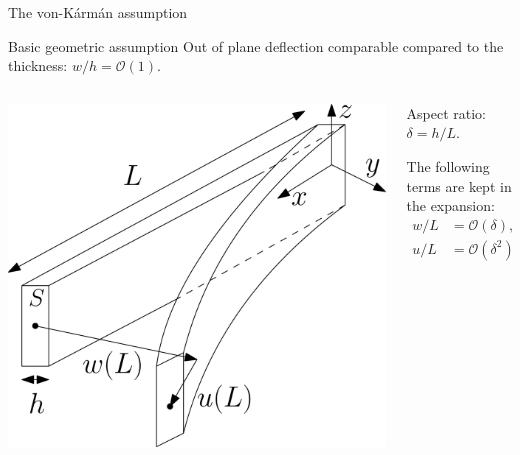 \documentclass[serif]{beamer} %
\begin{document}
\begin{frame}{The von-K\'arm\'an assumption}
		
\begin{block}{Basic geometric assumption}
	Out of plane deflection comparable compared to the thickness: $w/h = \mathcal{O}(1)$. \\
\end{block}

\begin{columns}
	\begin{column}{.55\textwidth}
		\includegraphics[width=1\columnwidth]{beam_deflected.eps}
	\end{column}
	\begin{column}{.45\textwidth}
		Aspect ratio: $\delta= h/L$.
		
		The following terms are kept in the expansion:
		\begin{equation*}
		\begin{aligned}
			w/L &= \mathcal{O}(\delta), \\
			u/L &= \mathcal{O}(\delta^2), \\
		\end{aligned}
		\end{equation*}
	\end{column}
\end{columns}

\end{frame}
\end{document}
